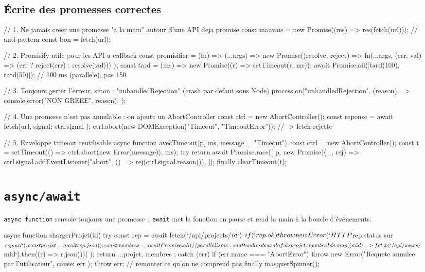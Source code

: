 \documentclass[12pt,a4paper,twoside,openright]{book}
\begin{document}
\subsection{\'Ecrire des promesses correctes}

\begin{codejs}
// 1. Ne jamais creer une promesse "a la main" autour d'une API deja promise
const mauvais = new Promise((res) => res(fetch(url)));      // anti-pattern
const bon = fetch(url);

// 2. Promisify utile pour les API a callback
const promisifier = (fn) => (...args) =>
  new Promise((resolve, reject) =>
    fn(...args, (err, val) => (err ? reject(err) : resolve(val)))
  );
const tard = (ms) => new Promise((r) => setTimeout(r, ms));
await Promise.all([tard(100), tard(50)]);     // 100 ms (parallele), pas 150

// 3. Toujours gerter l'erreur, sinon : "unhandledRejection" (crash par defaut sous Node)
process.on("unhandledRejection", (reason) => { console.error("NON GREEE", reason); });

// 4. Une promesse n'est pas annulable : on ajoute un AbortController
const ctrl = new AbortController();
const reponse = await fetch(url, { signal: ctrl.signal });
ctrl.abort(new DOMException("Timeout", "TimeoutError"));  // -> fetch rejette

// 5. Enveloppe timeout reutilisable
async function avecTimeout(p, ms, message = "Timeout") {
  const ctrl = new AbortController();
  const t = setTimeout(() => ctrl.abort(new Error(message)), ms);
  try {
    return await Promise.race([
      p,
      new Promise((_, rej) => ctrl.signal.addEventListener("abort", () => rej(ctrl.signal.reason))),
    ]);
  } finally { clearTimeout(t); }
}
\end{codejs}

\section{\texttt{async/await}}

\verb|async function| renvoie toujours une promesse~; \verb|await| met la fonction en pause
et rend la main \`a la boucle d'\'ev\'enements.

\begin{codejs}
async function chargerProjet(id) {
  try {
    const rep = await fetch(`/api/projects/${id}`);
    if (!rep.ok) throw new Error(`HTTP ${rep.status} sur ${rep.url}`);
    const projet = await rep.json();
    const membres = await Promise.all(              // parallelisme : on attend les deux a la fois
      projet.membreIds.map((mid) => fetch(`/api/users/${mid}`).then((r) => r.json()))
    );
    return { ...projet, membres };
  } catch (err) {
    if (err.name === "AbortError") throw new Error("Requete annulee par l'utilisateur", { cause: err });
    throw err;                                       // remonter ce qu'on ne comprend pas
  } finally {
    masquerSpinner();
  }
}
\end{codejs}
\end{document}
